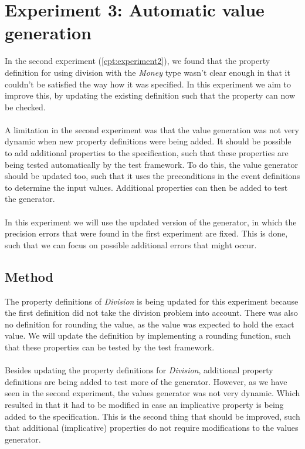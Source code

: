 \chapter{Experiment 3: Automatic value generation}
\label{cpt:experiment3}
In the second experiment (\autoref{cpt:experiment2}), we found that the property
definition for using division with the \textit{Money} type wasn't clear enough
in that it couldn't be satisfied the way how it was specified. In this
experiment we aim to improve this, by updating the existing definition such that
the property can now be checked.\\
\\
A limitation in the second experiment was that the value generation was not
very dynamic when new property definitions were being added. It should be possible to add
additional properties to the specification, such that these properties are being tested
automatically by the test framework. To do this, the value generator should be
updated too, such that it uses the preconditions in the event definitions to
determine the input values. Additional properties can then be added to test
the generator.\\
\\
In this experiment we will use the updated version of the generator, in which
the precision errors that were found in the first experiment are fixed.
This is done, such that we can focus on possible additional errors that might occur.

\section{Method}
The property definitions of \textit{Division} is being updated for this experiment because
the first definition did not take the division problem into account. There was
also no definition for rounding the value, as the value was expected to hold the
exact value. We will update the definition by implementing a rounding function,
such that these properties can be tested by the test
framework.\\
\\
Besides updating the property definitions for \textit{Division}, additional
property definitions are being added to test more of the generator. However, as
we have seen in the second experiment, the values generator was not very
dynamic. Which resulted in that it had to be modified in case an implicative
property is being added to the specification. This is the second thing that
should be improved, such that additional (implicative) properties do not require
modifications to the values generator.

